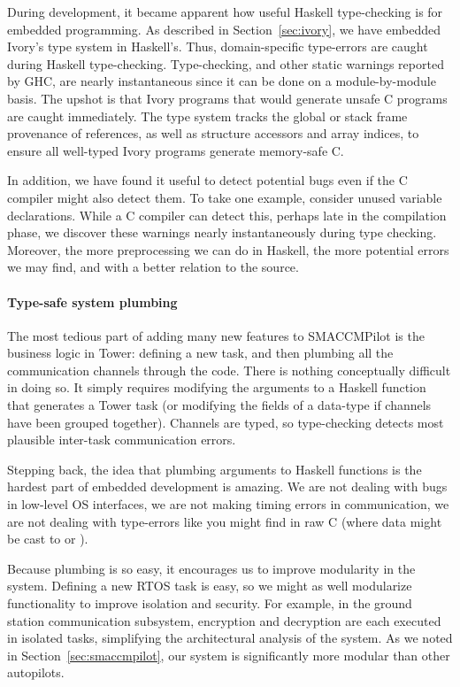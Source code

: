 During development, it became apparent how useful Haskell type-checking
is for embedded programming.  As described in Section~\ref{sec:ivory}, we
have embedded Ivory's type system in Haskell's.  Thus, domain-specific
type-errors are caught during Haskell type-checking.  Type-checking, and other
static warnings reported by GHC, are nearly instantaneous
since it can be done on a module-by-module basis.  The upshot is that Ivory
programs that would generate unsafe C programs are caught immediately.
The type system tracks the global or stack frame provenance of
references, as well as structure accessors and array indices, to ensure
all well-typed Ivory programs generate memory-safe C.

In addition, we have found it useful to detect potential bugs even if the C
compiler might also detect them.  To take one example, consider unused variable
declarations.  While a C compiler can detect this, perhaps late in the
compilation phase, we discover these warnings nearly instantaneously during type
checking.  Moreover, the more preprocessing we can do in Haskell, the more
potential errors we may find, and with a better relation to the source.

\paragraph{Type-safe system plumbing}
The most tedious part of adding many new features to SMACCMPilot is the business
logic in Tower: defining a new task, and then plumbing all the communication
channels through the code.  There is nothing conceptually difficult in doing so.
It simply requires modifying the arguments to a Haskell function that generates
a Tower task (or modifying the fields of a data-type if channels have been
grouped together).  Channels are typed, so type-checking detects most plausible
inter-task communication errors.

Stepping back, the idea that plumbing arguments to Haskell functions is the
hardest part of embedded development is amazing.  We are not dealing with bugs
in low-level OS interfaces, we are not making timing errors in communication, we
are not dealing with type-errors like you might find in raw C (where data might
be cast to  or ).

Because plumbing is so easy, it encourages us to improve modularity in the
system.  Defining a new RTOS task is easy, so we might as well modularize
functionality to improve isolation and security.  For example, in the ground
station communication subsystem, encryption and decryption are each executed in
isolated tasks, simplifying the architectural analysis of the system.  As
we noted in Section~\ref{sec:smaccmpilot}, our system is significantly more
modular than other autopilots.

